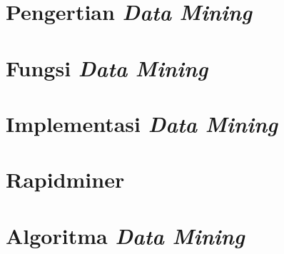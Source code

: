 \section{Pengertian \textit{Data Mining}}
\section{Fungsi \textit{Data Mining}}
\section{Implementasi \textit{Data Mining}}
\section{Rapidminer}
\section{Algoritma \textit{Data Mining}}
